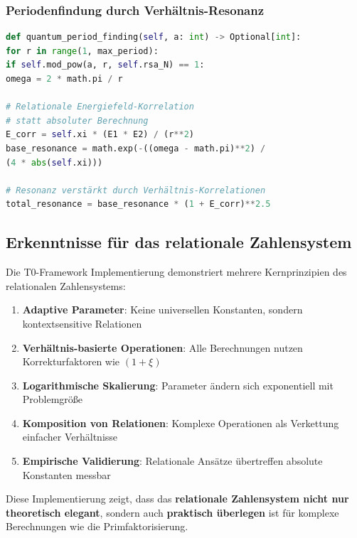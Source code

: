 	\subsubsection{Periodenfindung durch Verhältnis-Resonanz}
	\begin{lstlisting}[language=Python, breaklines=true, frame=none, basicstyle=\scriptsize\ttfamily]
def quantum_period_finding(self, a: int) -> Optional[int]:
for r in range(1, max_period):
if self.mod_pow(a, r, self.rsa_N) == 1:
omega = 2 * math.pi / r

# Relationale Energiefeld-Korrelation 
# statt absoluter Berechnung
E_corr = self.xi * (E1 * E2) / (r**2)
base_resonance = math.exp(-((omega - math.pi)**2) /
(4 * abs(self.xi)))

# Resonanz verstärkt durch Verhältnis-Korrelationen
total_resonance = base_resonance * (1 + E_corr)**2.5
\end{lstlisting}
	
	\subsection{Erkenntnisse für das relationale Zahlensystem}
	
	Die T0-Framework Implementierung demonstriert mehrere Kernprinzipien des relationalen Zahlensystems:
	
	\begin{enumerate}
		\item \textbf{Adaptive Parameter}: Keine universellen Konstanten, sondern kontextsensitive Relationen
		\item \textbf{Verhältnis-basierte Operationen}: Alle Berechnungen nutzen Korrekturfaktoren wie $(1 + \xi)$
		\item \textbf{Logarithmische Skalierung}: Parameter ändern sich exponentiell mit Problemgröße
		\item \textbf{Komposition von Relationen}: Komplexe Operationen als Verkettung einfacher Verhältnisse
		\item \textbf{Empirische Validierung}: Relationale Ansätze übertreffen absolute Konstanten messbar
	\end{enumerate}
	
	Diese Implementierung zeigt, dass das \textbf{relationale Zahlensystem nicht nur theoretisch elegant}, sondern auch \textbf{praktisch überlegen} ist für komplexe Berechnungen wie die Primfaktorisierung.
